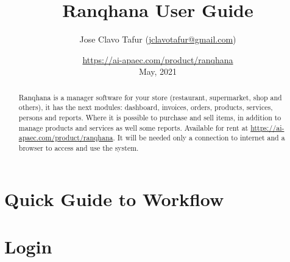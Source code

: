 \documentclass[a4paper,11pt]{refart}
\title{Ranqhana User Guide}
\author{Jose Clavo Tafur (\url{jclavotafur@gmail.com})}
\date{\url{https://ai-apaec.com/product/ranqhana}\\May, 2021}
\newcommand\Ranqhana{\textsf{Ranqhana}}
\begin{document}
\maketitle

\begin{abstract}
 \Ranqhana{} is a manager software for your store (restaurant, supermarket, shop and others), it has the next modules: dashboard, invoices, orders, products, services, persons and reports. Where it is possible to purchase and sell items, in addition to manage products and services as well some reports. Available for rent at \url{https://ai-apaec.com/product/ranqhana}. It will be needed only a connection to internet and a browser to access and use the system.
\end{abstract}

\tableofcontents
\clearpage

\section*{Quick Guide to Workflow}


%


\section{Login}
\end{document}
